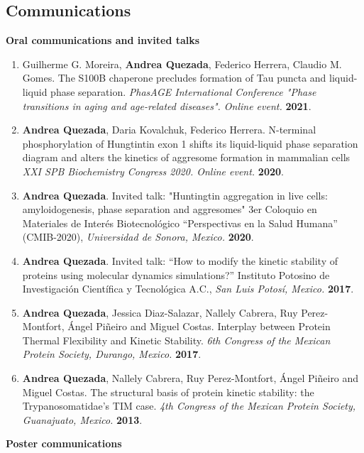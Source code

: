 \documentclass[letterpaper,11pt]{article}
\begin{document}
\subsection*{Communications}
\normalsize{\textbf{Oral communications and invited talks}}
\begin{enumerate}
\item Guilherme G. Moreira, \textbf{Andrea Quezada}, Federico Herrera, Claudio M. Gomes. The S100B chaperone precludes formation of Tau puncta and liquid-liquid phase separation. \emph{PhasAGE International Conference "Phase transitions in aging and age-related diseases". Online event.} \textbf{2021}.  
\item \textbf{Andrea Quezada}, Daria Kovalchuk, Federico Herrera. N-terminal phosphorylation of Hungtintin exon 1 shifts its liquid-liquid phase separation diagram and alters the kinetics of aggresome formation in mammalian cells \emph{XXI SPB Biochemistry Congress 2020. Online event.} \textbf{2020}.
\item \textbf{Andrea Quezada}. Invited talk: "Huntingtin aggregation in live cells: amyloidogenesis, phase separation and aggresomes"  3er Coloquio en Materiales de Interés Biotecnológico “Perspectivas en la Salud Humana” (CMIB-2020), \emph{Universidad de Sonora, Mexico.} \textbf{2020}.
 \item \textbf{Andrea Quezada}. Invited talk: ``How to modify the kinetic stability of proteins using molecular dynamics simulations?'' Instituto Potosino de Investigación Científica y Tecnológica A.C., \emph{San Luis Potosí, Mexico.} \textbf{2017}.
 \item \textbf{Andrea Quezada}, Jessica Diaz-Salazar, Nallely Cabrera, Ruy Perez-Montfort, Ángel Piñeiro and Miguel Costas. Interplay between Protein Thermal Flexibility and Kinetic Stability. \emph{6th Congress of the Mexican Protein Society, Durango, Mexico.} \textbf{2017}. %
  \item \textbf{Andrea Quezada}, Nallely Cabrera, Ruy Perez-Montfort, Ángel Piñeiro and Miguel Costas. The structural basis of protein kinetic stability: the Trypanosomatidae's TIM case. \emph{4th Congress of the Mexican Protein Society, Guanajuato, Mexico.} \textbf{2013}.
\end{enumerate}
\normalsize{\textbf{Poster communications}}
\end{document}
